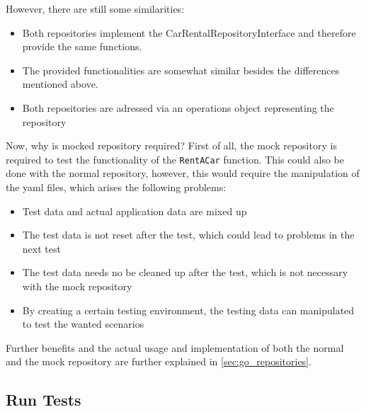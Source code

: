 However, there are still some similarities:
\begin{itemize}
      \item Both repositories implement the CarRentalRepositoryInterface and therefore provide the same functions.
      \item The provided functionalities are somewhat similar besides the differences mentioned above.
      \item Both repositories are adressed via an operations object representing the repository
\end{itemize}

Now, why is mocked repository required?
First of all, the mock repository is required to test the functionality of the \texttt{RentACar} function.
This could also be done with the normal repository, however, this would require the manipulation of the yaml files, which arises the following problems:
\begin{itemize}
      \item Test data and actual application data are mixed up
      \item The test data is not reset after the test, which could lead to problems in the next test
      \item The test data needs no be cleaned up after the test, which is not necessary with the mock repository
      \item By creating a certain testing environment, the testing data can manipulated to test the wanted scenarios
\end{itemize}

Further benefits and the actual usage and implementation of both the normal and the mock repository are further explained in \ref{sec:go_repositories}.

\subsection*{Run Tests}
